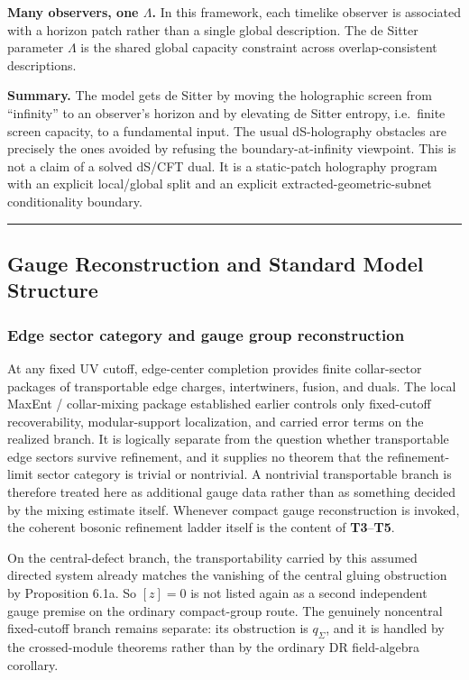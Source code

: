 \textbf{Many observers, one \(\Lambda\).} In this framework, each timelike observer is associated with a horizon patch rather than a single global description. The de Sitter parameter \(\Lambda\) is the shared global capacity constraint across overlap-consistent descriptions.

\textbf{Summary.} The model gets de Sitter by moving the holographic screen from ``infinity'' to an observer's horizon and by elevating de Sitter entropy, i.e.\ finite screen capacity, to a fundamental input. The usual dS-holography obstacles are precisely the ones avoided by refusing the boundary-at-infinity viewpoint. This is not a claim of a solved dS/CFT dual. It is a static-patch holography program with an explicit local/global split and an explicit extracted-geometric-subnet conditionality boundary.

\begin{center}\rule{0.5\linewidth}{0.5pt}\end{center}
\subsection{Gauge Reconstruction and Standard Model Structure}\label{6-gauge-reconstruction-and-standard-model-structure}

\subsubsection{Edge sector category and gauge group reconstruction}\label{61-edge-sector-category-and-gauge-group-reconstruction}

At any fixed UV cutoff, edge-center completion provides finite collar-sector packages of transportable edge charges, intertwiners, fusion, and duals. The local MaxEnt / collar-mixing package established earlier controls only fixed-cutoff recoverability, modular-support localization, and carried error terms on the realized branch. It is logically separate from the question whether transportable edge sectors survive refinement, and it supplies no theorem that the refinement-limit sector category is trivial or nontrivial. A nontrivial transportable branch is therefore treated here as additional gauge data rather than as something decided by the mixing estimate itself. Whenever compact gauge reconstruction is invoked, the coherent bosonic refinement ladder itself is the content of \textbf{T3}--\textbf{T5}.

On the central-defect branch, the transportability carried by this assumed directed system already matches the vanishing of the central gluing obstruction by Proposition 6.1a. So \([z]=0\) is not listed again as a second independent gauge premise on the ordinary compact-group route. The genuinely noncentral fixed-cutoff branch remains separate: its obstruction is \(q_\Sigma\), and it is handled by the crossed-module theorems rather than by the ordinary DR field-algebra corollary.

